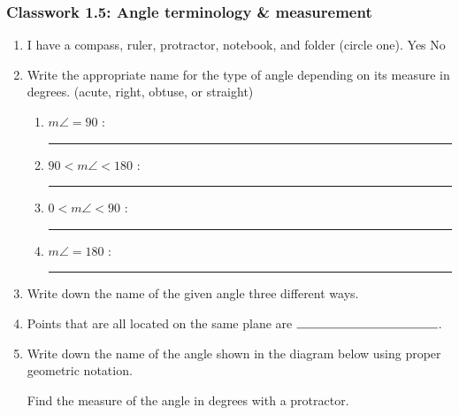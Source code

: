 \documentclass[12pt, twoside]{article}
\begin{document}
\subsubsection*{Classwork 1.5: Angle terminology \& measurement}
  \vspace{0.25cm}
  \begin{enumerate}
    \item I have a compass, ruler, protractor, notebook, and folder (circle one). Yes \qquad No
    \vspace{0.25cm}

    \item Write the appropriate name for the type of angle depending on its measure in degrees. (acute, right, obtuse, or straight)
    \begin{enumerate}
      \item $m\angle = 90$ : \rule{4cm}{0.15mm} \bigskip
      \item $90 < m\angle < 180$ : \rule{4cm}{0.15mm} \bigskip
      \item $0< m\angle < 90$ : \rule{4cm}{0.15mm} \bigskip
      \item $m\angle = 180$ : \rule{4cm}{0.15mm} \bigskip
    \end{enumerate}

    \item Write down the name of the given angle three different ways.\\

    \item Points that are all located on the same plane are $\rule{4cm}{0.15mm}$.

    \item Write down the name of the angle shown in the diagram below using proper geometric notation.
    \begin{center}
    \end{center}
    Find the measure of the angle in degrees with a protractor.


\end{enumerate}
\end{document}
